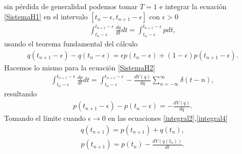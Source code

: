 sin pérdida de generalidad podemos tomar $T=1$ e integrar la ecuación \eqref{SistemaH1} en el intervalo $[t_{n}-\epsilon,t_{n+1}-\epsilon]$ con $\epsilon>0$
\begin{eqnarray}
\int_{t_{n}-\epsilon}^{t_{n+1}-\epsilon}\frac{dq}{dt}dt=\int_{t_{n}-\epsilon}^{t_{n+1}-\epsilon}pdt,
\label{integral1}
\end{eqnarray}
usando el teorema fundamental del cálculo
\begin{eqnarray}
q(t_{n+1}-\epsilon)-q(t_{n}-\epsilon)=\epsilon p(t_{n}-\epsilon)+(1-\epsilon)p(t_{n+1}-\epsilon).
\label{integral2}
\end{eqnarray}
Hacemos lo mismo para la ecuación \eqref{SistemaH2}
\begin{eqnarray}
\int_{t_{n}-\epsilon}^{t_{n+1}-\epsilon}\frac{dp}{dt}dt=\int_{t_{n}-\epsilon}^{t_{n+1}-\epsilon}-\frac{dV(q)}{dq}\sum_{n=-\infty}^{\infty}\delta(t-n),
\label{integral3}
\end{eqnarray}
resultando
\begin{eqnarray}
p(t_{n+1}-\epsilon)-p(t_{n}-\epsilon)=-\frac{dV(q)}{dq}.
\label{integral4}
\end{eqnarray}
Tomando el límite cuando $\epsilon\rightarrow 0$ en las ecuaciones \eqref{integral2},\eqref{integral4} 
\begin{eqnarray}
q(t_{n+1})=p(t_{n+1})+q(t_{n}),
\label{sistema hamilton a}
\end{eqnarray}
\begin{eqnarray}
p(t_{n+1})=p(t_{n})-\frac{dV(q(t_{n}))}{dt}.
\label{sistema hamilton b}
\end{eqnarray}




